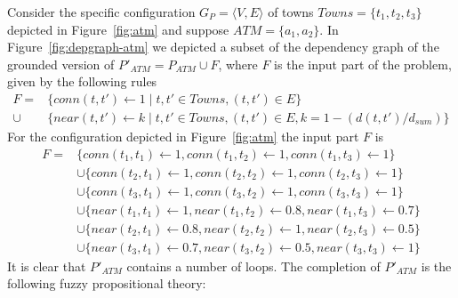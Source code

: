 \documentclass{tlp}
\begin{document}
Consider the specific configuration $G_P = \langle V,E \rangle$ of towns $Towns = \{ t_1, t_2, t_3 \}$ depicted in Figure~\ref{fig:atm} and suppose $\mathit{ATM} = \{a_1,a_2\}$. In Figure~\ref{fig:depgraph-atm} we depicted a subset of the dependency graph of the grounded version of $P'_{\mathit{ATM}} = P_{\mathit{ATM}} \cup F$, where $F$ is the input part of the problem, given by the following rules
\begin{align*}
 F = & \{ conn(t,t') \gets 1 \mid t,t' \in Towns, (t,t') \in E \} \\
   \cup & \{ near(t,t') \gets k \mid t,t' \in Towns, (t,t') \in E, k = 1-(d(t,t')/d_{sum}) \}
\end{align*}
For the configuration depicted in Figure~\ref{fig:atm} the input part $F$ is
\begin{align*}
 F = &\{ conn(t_1,t_1) \gets 1, conn(t_1,t_2) \gets 1, conn(t_1,t_3) \gets 1\}\\
& \cup \{ conn(t_2,t_1) \gets 1, conn(t_2,t_2) \gets 1, conn(t_2,t_3) \gets 1 \}\\
& \cup \{ conn(t_3,t_1) \gets 1, conn(t_3,t_2) \gets 1, conn(t_3,t_3) \gets 1 \}\\
& \cup \{ near(t_1,t_1) \gets 1, near(t_1,t_2) \gets 0.8, near(t_1,t_3) \gets 0.7 \}\\
& \cup \{ near(t_2,t_1) \gets 0.8, near(t_2,t_2) \gets 1, near(t_2,t_3) \gets 0.5 \}\\
& \cup \{ near(t_3,t_1) \gets 0.7, near(t_3,t_2) \gets 0.5, near(t_3,t_3) \gets 1 \}
\end{align*}
It is clear that $P'_{\mathit{ATM}}$ contains a number of loops. The completion of $P'_{\mathit{ATM}}$ is the following fuzzy propositional theory:
\end{document}

